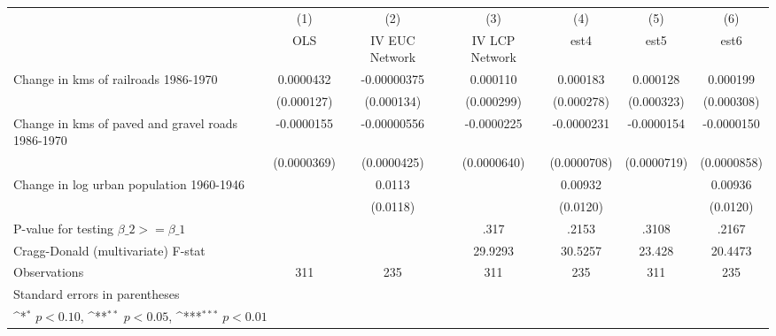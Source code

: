 {
\def\sym#1{\ifmmode^{#1}\else\(^{#1}\)\fi}
\begin{tabular}{l*{6}{c}}
\hline\hline
                &\multicolumn{1}{c}{(1)}&\multicolumn{1}{c}{(2)}&\multicolumn{1}{c}{(3)}&\multicolumn{1}{c}{(4)}&\multicolumn{1}{c}{(5)}&\multicolumn{1}{c}{(6)}\\
                &\multicolumn{1}{c}{OLS}&\multicolumn{1}{c}{IV EUC Network}&\multicolumn{1}{c}{IV LCP Network}&\multicolumn{1}{c}{est4}&\multicolumn{1}{c}{est5}&\multicolumn{1}{c}{est6}\\
\hline
Change in kms of railroads 1986-1970&0.0000432         &-0.00000375         & 0.000110         & 0.000183         & 0.000128         & 0.000199         \\
                &(0.000127)         &(0.000134)         &(0.000299)         &(0.000278)         &(0.000323)         &(0.000308)         \\
[1em]
Change in kms of paved and gravel roads 1986-1970&-0.0000155         &-0.00000556         &-0.0000225         &-0.0000231         &-0.0000154         &-0.0000150         \\
                &(0.0000369)         &(0.0000425)         &(0.0000640)         &(0.0000708)         &(0.0000719)         &(0.0000858)         \\
[1em]
Change in log urban population 1960-1946&                  &   0.0113         &                  &  0.00932         &                  &  0.00936         \\
                &                  & (0.0118)         &                  & (0.0120)         &                  & (0.0120)         \\
\hline
P-value for testing $\beta\_{2} >= \beta\_{1}$&                  &                  &     .317         &    .2153         &    .3108         &    .2167         \\
Cragg-Donald (multivariate) F-stat&                  &                  &  29.9293         &  30.5257         &   23.428         &  20.4473         \\
Observations    &      311         &      235         &      311         &      235         &      311         &      235         \\
\hline\hline
\multicolumn{7}{l}{\footnotesize Standard errors in parentheses}\\
\multicolumn{7}{l}{\footnotesize \sym{*} \(p<0.10\), \sym{**} \(p<0.05\), \sym{***} \(p<0.01\)}\\
\end{tabular}
}
